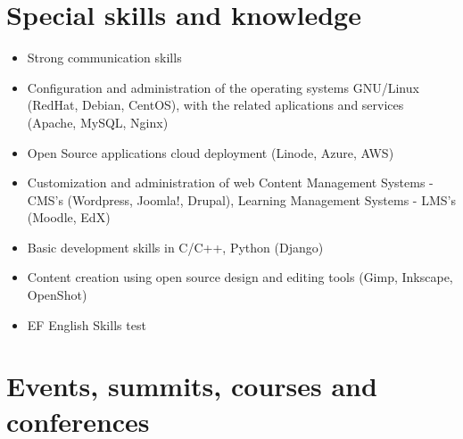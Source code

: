 \documentclass[overlapped,line,final]{res}
\begin{document}
\begin{resume}
\section{\sc Special skills and knowledge}
\vspace{0.5cm}
\begin{itemize}
	\item Strong communication skills 
	\item Configuration and administration of the operating systems GNU/Linux (RedHat, Debian, CentOS), with the related aplications and services (Apache, MySQL, Nginx)
	\item Open Source applications cloud deployment (Linode, Azure, AWS) 
	\item Customization and administration of web Content Management Systems - CMS's (Wordpress, Joomla!, Drupal), Learning Management Systems - LMS's (Moodle, EdX)
	\item Basic development skills in C/C++, Python (Django)
 	\item Content creation using open source design and editing tools (Gimp, Inkscape, OpenShot)
	\item EF English Skills test \href{https://raw.githubusercontent.com/Open-SAI/NemqCV/master/latex/docs/efTest2021.pdf}{}
\end{itemize}

\section{\sc Events, summits, courses and conferences}
\vspace{0.5cm}
\begin{itemize}


\end{itemize}
\end{resume}
\end{document}

